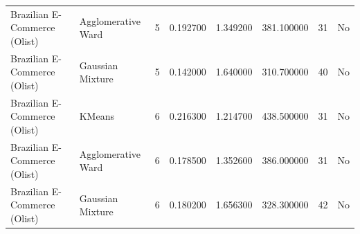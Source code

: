 \begin{tabular}{llrrrrrl}
Brazilian E-Commerce (Olist) & Agglomerative Ward & 5 & 0.192700 & 1.349200 & 381.100000 & 31 & No \\
Brazilian E-Commerce (Olist) & Gaussian Mixture & 5 & 0.142000 & 1.640000 & 310.700000 & 40 & No \\
Brazilian E-Commerce (Olist) & KMeans & 6 & 0.216300 & 1.214700 & 438.500000 & 31 & No \\
Brazilian E-Commerce (Olist) & Agglomerative Ward & 6 & 0.178500 & 1.352600 & 386.000000 & 31 & No \\
Brazilian E-Commerce (Olist) & Gaussian Mixture & 6 & 0.180200 & 1.656300 & 328.300000 & 42 & No \\
\bottomrule
\end{tabular}
